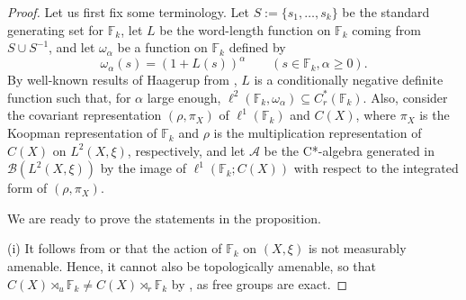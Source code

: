 \documentclass[12pt]{amsart}
\theoremstyle{definition}
\theoremstyle{remark}
\numberwithin{equation}{section}
\newcommand{\F}{\mathbb{F}}
\begin{document}
\begin{proof}
Let us first fix some terminology. Let $S:=\{s_1,\ldots,s_k\}$ be the standard generating set for $\F_k$, let $L$ be the word-length function on $\F_k$ coming from $S\cup S^{-1}$, and let $\omega_\alpha$ be a function on $\F_k$ defined by
$$\omega_\alpha(s)=(1+L(s))^\alpha \qquad (s\in \F_k,\alpha\geq 0).$$
By well-known results of Haagerup from \cite{Haag}, $L$ is a conditionally negative definite function such that, for $\alpha$ large enough, $\ell^2(\F_k,\omega_\alpha)\subseteq C^*_r(\F_k)$. Also, consider the covariant representation $(\rho,\pi_X)$ of $\ell^1(\F_k)$ and $C(X)$, where $\pi_X$ is the Koopman representation of $\F_k$ and $\rho$ is the multiplication representation of $C(X)$ on $L^2(X,\xi)$, respectively, and let $\mathcal{A}$ be the C*-algebra generated in
$\mathcal{B}(L^2(X,\xi))$ by the image of $\ell^1(\F_k;C(X))$ with respect to the integrated form of $(\rho,\pi_X)$.

We are ready to prove the statements in the proposition.


\smallskip

(i) It follows from \cite[Corollary to Theorem 3.5]{Nevo1} or \cite[Theorem 9.2]{nevosageev} that the action of $\F_k$ on $(X,\xi)$ is not measurably amenable. Hence, it cannot also be topologically amenable, so that $C(X)\rtimes_u \F_k \neq C(X)\rtimes_r \F_k$ by \cite{Matsumura}, as free groups are exact.


\end{proof}
\end{document}
